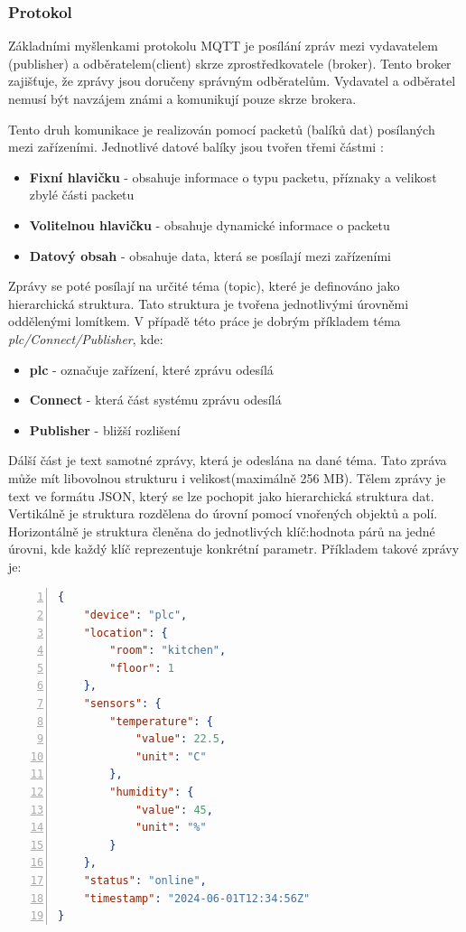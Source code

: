 \subsubsection{Protokol}
Základními myšlenkami protokolu MQTT je posílání zpráv mezi vydavatelem (publisher) a odběratelem(client) skrze zprostředkovatele (broker). Tento broker zajišťuje, že zprávy jsou doručeny správným odběratelům. Vydavatel a odběratel nemusí být navzájem známi a komunikují pouze skrze brokera. \cite{MQTT}

Tento druh komunikace je realizován pomocí packetů (balíků dat) posílaných mezi zařízeními. Jednotlivé datové balíky jsou tvořen třemi částmi \cite{MQTTEsentials}:
\begin{itemize}
    \item \textbf{Fixní hlavičku} - obsahuje informace o typu packetu, příznaky a velikost zbylé části packetu 
    \item \textbf{Volitelnou hlavičku} - obsahuje dynamické informace o packetu
    \item \textbf{Datový obsah} - obsahuje data, která se posílají mezi zařízeními \newline
\end{itemize}
Zprávy se poté posílají na určité téma (topic), které je definováno jako hierarchická struktura. Tato struktura je tvořena jednotlivými úrovněmi oddělenými lomítkem. V případě této práce je dobrým příkladem téma \textit{plc/Connect/Publisher}, kde:
\begin{itemize}
    \item \textbf{plc} - označuje zařízení, které zprávu odesílá
    \item \textbf{Connect} - která část systému zprávu odesílá
    \item \textbf{Publisher} - bližší rozlišení \newline
\end{itemize}
Dálší část je text samotné zprávy, která je odeslána na dané téma. Tato zpráva může mít libovolnou strukturu i velikost(maximálně 256 MB). Tělem zprávy je text ve formátu JSON, který se lze pochopit jako hierarchická struktura dat. Vertikálně je struktura rozdělena do úrovní pomocí vnořených objektů a polí. Horizontálně je struktura členěna do jednotlivých klíč:hodnota párů na jedné úrovni, kde každý klíč reprezentuje konkrétní parametr. Příkladem takové zprávy je:
\begin{lstlisting}[language=JSON, breaklines=true, numbers=left, numberstyle=\small, numbersep=10pt, frame=single, basicstyle=\ttfamily\small, caption={Příklad zprávy v JSON}, label={lst:json}]
{
    "device": "plc",
    "location": {
        "room": "kitchen",
        "floor": 1
    },
    "sensors": {
        "temperature": {
            "value": 22.5,
            "unit": "C"
        },
        "humidity": {
            "value": 45,
            "unit": "%"
        }
    },
    "status": "online",
    "timestamp": "2024-06-01T12:34:56Z"
}
\end{lstlisting}

